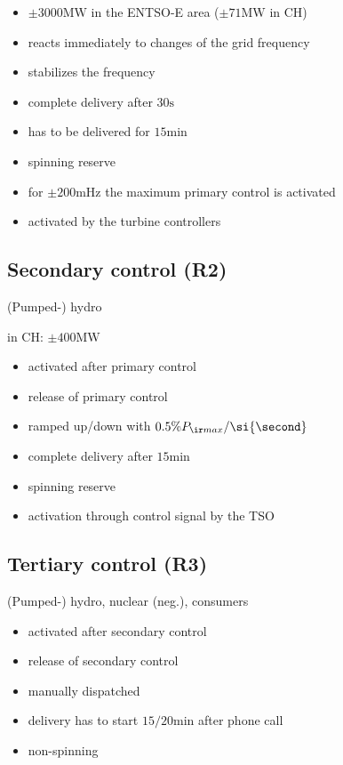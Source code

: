 \documentclass[fs, footer]{latex4ei}
\begin{document}
\begin{multicols*}{4}
\begin{itemize}
	\item $\pm 3000 \si{\mega \watt}$ in the ENTSO-E area ($\pm 71 \si{\mega \watt}$ in CH)
	\item reacts immediately to changes of the grid frequency
	\item stabilizes the frequency
	\item complete delivery after $30 \si{\second}$
	\item has to be delivered for $15 \si{\minute}$
	\item spinning reserve
	\item for $\pm 200 \si{\milli \hertz}$ the maximum primary control is activated
	\item activated by the turbine controllers
\end{itemize}



\subsection{Secondary control (R2)}
(Pumped-) hydro

in CH: $\pm 400 \si{\mega \watt} $
\begin{itemize}
	\item activated after primary control
	\item release of primary control
	\item ramped up/down with $0.5 \% P_{\ir max} / \si{\second}$
	\item complete delivery after $15 \si{\minute} $
	\item spinning reserve
	\item activation through control signal by the TSO
\end{itemize}

\subsection{Tertiary control (R3)} 
(Pumped-) hydro, nuclear (neg.), consumers
\begin{itemize}
	\item activated after secondary control
	\item release of secondary control
	\item manually dispatched
	\item delivery has to start $15/20 \si{\minute}$ after phone call
	\item non-spinning
\end{itemize}


\end{multicols*}
\end{document}
